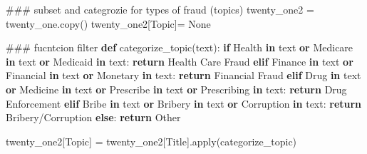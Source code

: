 \documentclass[
  letterpaper,
  DIV=11,
  numbers=noendperiod]{scrartcl}
\newenvironment{Shaded}{\begin{snugshade}}{\end{snugshade}}
\newcommand{\BuiltInTok}[1]{\textcolor[rgb]{0.00,0.23,0.31}{#1}}
\newcommand{\CommentTok}[1]{\textcolor[rgb]{0.37,0.37,0.37}{#1}}
\newcommand{\ControlFlowTok}[1]{\textcolor[rgb]{0.00,0.23,0.31}{\textbf{#1}}}
\newcommand{\KeywordTok}[1]{\textcolor[rgb]{0.00,0.23,0.31}{\textbf{#1}}}
\newcommand{\NormalTok}[1]{\textcolor[rgb]{0.00,0.23,0.31}{#1}}
\newcommand{\OperatorTok}[1]{\textcolor[rgb]{0.37,0.37,0.37}{#1}}
\newcommand{\StringTok}[1]{\textcolor[rgb]{0.13,0.47,0.30}{#1}}
\newcommand{\VariableTok}[1]{\textcolor[rgb]{0.07,0.07,0.07}{#1}}
\begin{document}
\begin{Shaded}
\begin{Highlighting}[]
\CommentTok{\#\#\# subset and categrozie for types of fraud (topics)}
\NormalTok{twenty\_one2 }\OperatorTok{=}\NormalTok{ twenty\_one.copy()}
\NormalTok{twenty\_one2[}\StringTok{\textquotesingle{}Topic\textquotesingle{}}\NormalTok{]}\OperatorTok{=} \VariableTok{None}

\CommentTok{\#\#\# fucntcion filter}
\KeywordTok{def}\NormalTok{ categorize\_topic(text):}
    \ControlFlowTok{if} \StringTok{\textquotesingle{}Health\textquotesingle{}} \KeywordTok{in}\NormalTok{ text }\KeywordTok{or} \StringTok{\textquotesingle{}Medicare\textquotesingle{}} \KeywordTok{in}\NormalTok{ text }\KeywordTok{or} \StringTok{\textquotesingle{}Medicaid\textquotesingle{}} \KeywordTok{in}\NormalTok{ text:}
        \ControlFlowTok{return} \StringTok{\textquotesingle{}Health Care Fraud\textquotesingle{}}
    \ControlFlowTok{elif} \StringTok{\textquotesingle{}Finance\textquotesingle{}} \KeywordTok{in}\NormalTok{ text }\KeywordTok{or} \StringTok{\textquotesingle{}Financial\textquotesingle{}} \KeywordTok{in}\NormalTok{ text }\KeywordTok{or} \StringTok{\textquotesingle{}Monetary\textquotesingle{}} \KeywordTok{in}\NormalTok{ text:}
        \ControlFlowTok{return} \StringTok{\textquotesingle{}Financial Fraud\textquotesingle{}}
    \ControlFlowTok{elif} \StringTok{\textquotesingle{}Drug\textquotesingle{}} \KeywordTok{in}\NormalTok{ text }\KeywordTok{or} \StringTok{\textquotesingle{}Medicine\textquotesingle{}} \KeywordTok{in}\NormalTok{ text }\KeywordTok{or} \StringTok{\textquotesingle{}Prescribe\textquotesingle{}} \KeywordTok{in}\NormalTok{ text }\KeywordTok{or} \StringTok{\textquotesingle{}Prescribing\textquotesingle{}} \KeywordTok{in}\NormalTok{ text:}
        \ControlFlowTok{return} \StringTok{\textquotesingle{}Drug Enforcement\textquotesingle{}}
    \ControlFlowTok{elif} \StringTok{\textquotesingle{}Bribe\textquotesingle{}} \KeywordTok{in}\NormalTok{ text }\KeywordTok{or} \StringTok{\textquotesingle{}Bribery\textquotesingle{}} \KeywordTok{in}\NormalTok{ text }\KeywordTok{or} \StringTok{\textquotesingle{}Corruption\textquotesingle{}} \KeywordTok{in}\NormalTok{ text:}
        \ControlFlowTok{return} \StringTok{\textquotesingle{}Bribery/Corruption\textquotesingle{}}
    \ControlFlowTok{else}\NormalTok{:}
        \ControlFlowTok{return} \StringTok{\textquotesingle{}Other\textquotesingle{}}

\NormalTok{twenty\_one2[}\StringTok{\textquotesingle{}Topic\textquotesingle{}}\NormalTok{] }\OperatorTok{=}\NormalTok{ twenty\_one2[}\StringTok{\textquotesingle{}Title\textquotesingle{}}\NormalTok{].}\BuiltInTok{apply}\NormalTok{(categorize\_topic)}
\end{Highlighting}
\end{Shaded}
\end{document}
